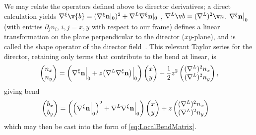  We may relate the operators defined above to director derivatives; a direct calculation yields $\nabla^\xi \v{b} = (\nabla^\xi{\bf n}|_{0})^2+\nabla^L \nabla^\xi{\bf n}|_{0}$ , $\nabla^L \v b = (\nabla^L)^2 \v n$. $\nabla^{\xi}{\bf n} \bigr|_{0}$ (with entries $\partial_j n_i$, $i,j=x,y$ with respect to our frame) defines a linear transformation on the plane perpendicular to the director ($xy$-plane), and is called the shape operator of the director field~\cite{machon16,alexander18}. This relevant Taylor series for the director, retaining only terms that contribute to the bend at linear, is
\begin{align}
\begin{pmatrix} n_x \\ n_y \end{pmatrix} & = \biggl( \Bigl. \nabla^\xi {\bf n} \Bigr\rvert_0 + z \Bigl. \bigl( \nabla^L\nabla^\xi {\bf n} \bigr) \Bigr\rvert_0 \biggr) \begin{pmatrix} x \\ y \end{pmatrix} + \frac{1}{2} z^2 \begin{pmatrix} (\nabla^L)^2 n_x \\ (\nabla^L)^2 n_y \end{pmatrix}, \\
\end{align}
giving bend
\begin{align}
\begin{pmatrix}b_x \\ b_y\end{pmatrix} & =
 \biggl( \Big( \Bigl. \nabla^\xi {\bf n} \Bigr\rvert_0 \Big)^2 + \Bigl. \nabla^L\nabla^\xi {\bf n} \Bigr\rvert_0 \biggr) \begin{pmatrix} x \\ y \end{pmatrix}
 + z \begin{pmatrix}(\nabla^L)^2 n_x \\ (\nabla^L)^2 n_y \end{pmatrix}
\label{eq:LocalBend}
\end{align}
which may then be cast into the form of \eqref{eq:LocalBendMatrix}.

